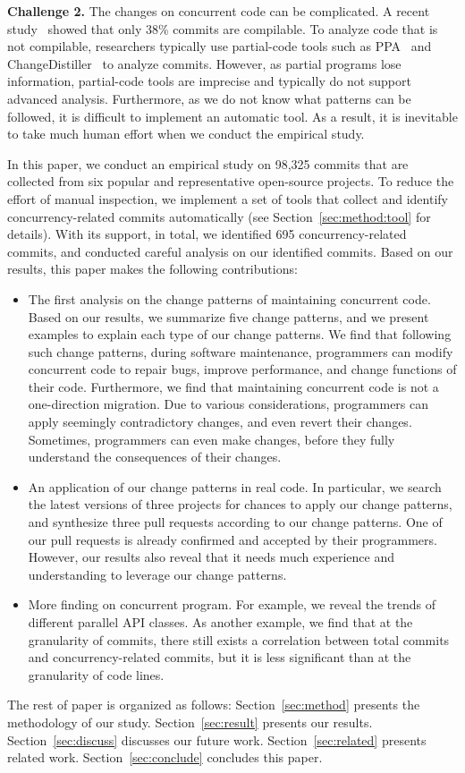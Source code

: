 \noindent
\textbf{Challenge 2.} The changes on concurrent code can be complicated. A recent study~\cite{tufano2016there} showed that only 38\% commits are compilable. To analyze code that is not compilable, researchers typically use partial-code tools such as PPA~\cite{DagenaisH08ppa} and ChangeDistiller~\cite{fluri2007change} to analyze commits. However, as partial programs lose information, partial-code tools are imprecise and typically do not support advanced analysis. Furthermore, as we do not know what patterns can be followed, it is difficult to implement an automatic tool. As a result, it is inevitable to take much human effort when we conduct the empirical study.

In this paper, we conduct an empirical study on 98,325 commits that are collected from six popular and representative open-source projects. To reduce the effort of manual inspection, we implement a set of tools that collect and identify concurrency-related commits automatically (see Section~\ref{sec:method:tool} for details). With its support, in total, we identified 695 concurrency-related commits, and conducted careful analysis on our identified commits. Based on our results, this paper makes the following contributions:

\begin{itemize}
	\item The first analysis on the change patterns of maintaining concurrent code. Based on our results, we summarize five change patterns, and we present examples to explain each type of our change patterns. We find that following such change patterns, during software maintenance, programmers can modify concurrent code to repair bugs, improve performance, and change functions of their code. Furthermore, we find that maintaining concurrent code is not a one-direction migration. Due to various considerations, programmers can apply seemingly contradictory changes, and even revert their changes. Sometimes, programmers can even make changes, before they fully understand the consequences of their changes.
	\item An application of our change patterns in real code. In particular, we search the latest versions of three projects for chances to apply our change patterns, and synthesize three pull requests according to our change patterns. One of our pull requests is already confirmed and accepted by their programmers. However, our results also reveal that it needs much experience and understanding to leverage our change patterns.
	\item More finding on concurrent program. For example, we reveal the trends of different parallel API classes. As another example, we find that at the granularity of commits, there still exists a correlation between total commits and concurrency-related commits, but it is less significant than at the granularity of code lines.
\end{itemize}

The rest of paper is organized as follows: Section~\ref{sec:method} presents the methodology of our study. Section~\ref{sec:result} presents our results. Section~\ref{sec:discuss} discusses our future work. Section~\ref{sec:related} presents related work. Section~\ref{sec:conclude} concludes this paper.

